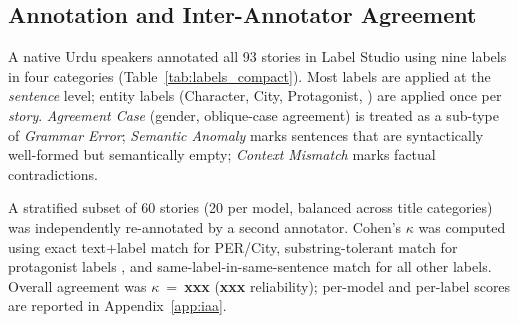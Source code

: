 \documentclass[11pt]{article}
\begin{document}
\subsection{Annotation and Inter-Annotator Agreement}
\label{subsec:annotation}

A native Urdu speakers annotated all 93 stories in
Label Studio using nine labels in four categories
(Table~\ref{tab:labels_compact}). Most labels are applied
at the \emph{sentence} level; entity labels (Character,
City, Protagonist,
) are applied once per
\emph{story}. \emph{Agreement Case} (gender,
oblique-case agreement) is treated as a sub-type of
\emph{Grammar Error}; \emph{Semantic Anomaly} marks sentences that
are syntactically well-formed but semantically empty;
\emph{Context Mismatch} marks factual contradictions.

A stratified subset of 60 stories (20 per model,
balanced across title categories) was independently
re-annotated by a second annotator. Cohen's $\kappa$ was
computed using exact text+label match for PER/City,
substring-tolerant match for protagonist labels , and same-label-in-same-sentence
match for all other labels. Overall agreement was
$\kappa$~=~\textbf{xxx} (\textbf{xxx} reliability); per-model
and per-label scores are reported in
Appendix~\ref{app:iaa}.
\end{document}
